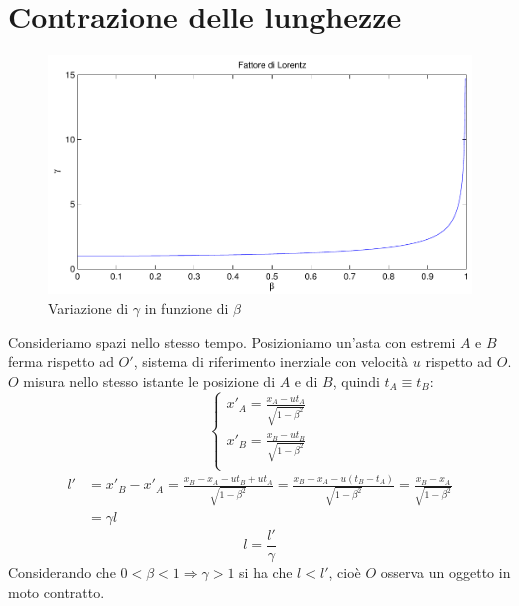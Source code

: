\section{Contrazione delle lunghezze}
\begin{figure}[htbp]
   \centering
   \includegraphics[scale=0.5]{immagini/fisica1/beta_gamma}
   \caption{Variazione di $\gamma$ in funzione di $\beta$}
\end{figure}
Consideriamo spazi nello stesso tempo. Posizioniamo un'asta con estremi $A$ e $B$ ferma rispetto ad $O'$, sistema di riferimento inerziale con velocità $u$ rispetto ad $O$.
$O$ misura nello stesso istante le posizione di $A$ e di $B$, quindi $t_A\equiv t_B$:
\begin{equation*}\left\{
\begin{array}{l}
x'_A=\frac{x_A-ut_A}{\sqrt{1-\beta^2}}\\
x'_B=\frac{x_B-ut_B}{\sqrt{1-\beta^2}}\\
\end{array}
\right.\end{equation*}
\begin{align*}
l'&=x'_B-x'_A=\frac{x_B-x_A-ut_B+ut_A}{\sqrt{1-\beta^2}}=\frac{x_B-x_A-u(t_B-t_A)}{\sqrt{1-\beta^2}}=\frac{x_B-x_A}{\sqrt{1-\beta^2}}\\
&=\gamma l
\end{align*}
\begin{equation}
l=\frac{l'}{\gamma}
\end{equation}
Considerando che $0<\beta<1\Rightarrow\gamma>1$ si ha che $l<l'$, cioè $O$ osserva un oggetto in moto contratto.

